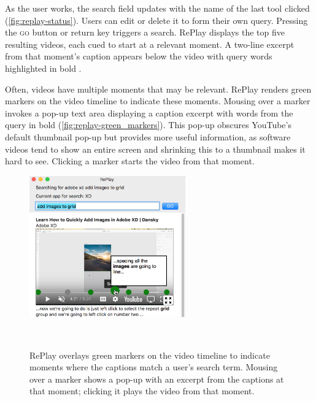 As the user works, the search field updates with the name of the last tool clicked (\autoref{fig:replay-status}). Users can edit or delete it to form their own query. Pressing the \textsc{go} button or return key triggers a search. RePlay displays the top five resulting videos, each cued to start at a relevant moment. A two-line excerpt from that moment's caption appears below the video with query words highlighted in bold \cite{Hearst2009Book}.

Often, videos have multiple moments that may be relevant. RePlay renders green markers on the video timeline to indicate these moments. Mousing over a marker invokes a pop-up text area displaying a caption excerpt with words from the query in bold (\autoref{fig:replay-green_markers}). This pop-up obscures YouTube's default thumbnail pop-up but provides more useful information, as software videos tend to show an entire screen and shrinking this to a thumbnail makes it hard to see. Clicking a marker starts the video from that moment. 

\begin{figure}[b!]
\centering
  \includegraphics[width=0.6\textwidth]{replay/figures/green_markers.png}
  \caption{RePlay overlays green markers on the video timeline to indicate moments where the captions match a user's search term. Mousing over a marker shows a pop-up with an excerpt from the captions at that moment; clicking it plays the video from that moment. }~\label{fig:replay-green_markers}
\end{figure}

